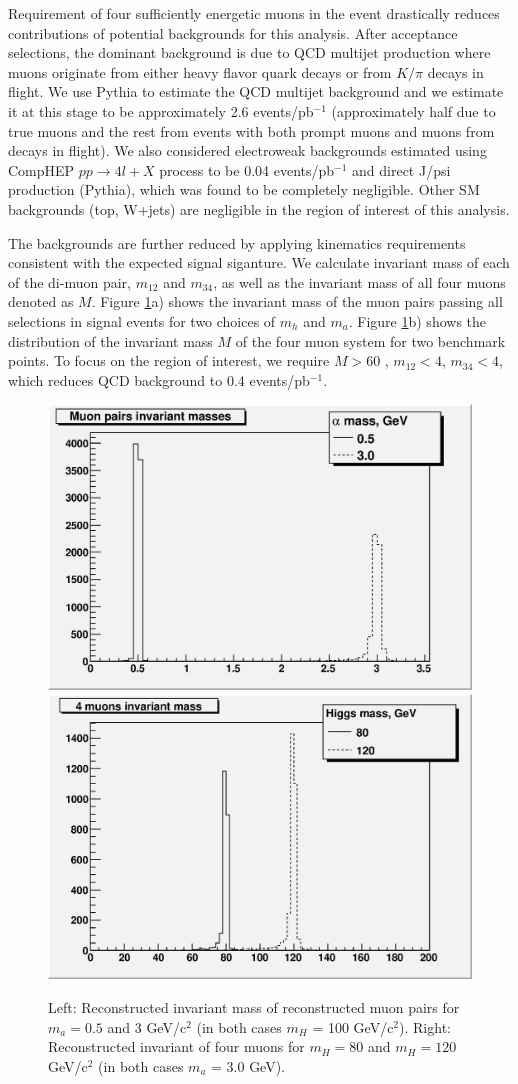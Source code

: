 \documentclass[aps,prl,twocolumn,nofootinbib,superscriptaddress]{revtex4}
\begin{document}
{Requirement of four sufficiently energetic muons in the event drastically reduces contributions of 
potential backgrounds for this analysis. After acceptance selections, the dominant background is 
due to QCD multijet production where muons originate from either heavy flavor quark decays or from 
$K/\pi$ decays in flight. We use Pythia to estimate the QCD multijet background and we estimate it
at this stage to be approximately 2.6 events/pb$^{-1}$ (approximately half due to true muons and the 
rest from events with both prompt muons and muons from decays in flight). We also considered electroweak 
backgrounds estimated using CompHEP $pp \to 4l+X$ process to be 0.04 events/pb$^{-1}$ and direct J/psi 
production (Pythia), which was found to be completely negligible. Other SM backgrounds (top, W+jets) 
are negligible in the region of interest of this analysis.

The backgrounds are further reduced by applying kinematics requirements consistent
with the expected signal siganture. We calculate invariant mass of each of the di-muon pair, 
$m_{12}$ and $m_{34}$, as well as the invariant mass of all four muons denoted as $M$. Figure 
\ref{muon_pairs_masses_invariant_mass}a) shows the invariant mass of the muon pairs passing 
all selections in signal events for two choices of $m_h$ and $m_a$. Figure \ref{muon_pairs_masses_invariant_mass}b) 
shows the distribution of the invariant mass $M$ of the four muon system for two benchmark points. 
To focus on the region of interest, we require $M>60$ \gevcc, $m_{12} < 4$, $m_{34} < 4$, which
reduces QCD background to 0.4 events/pb$^{-1}$. 

\begin{figure}[htb]
\begin{center}
\includegraphics[width=0.48\linewidth]{plots/muon_pairs_masses.eps}
\includegraphics[width=0.48\linewidth]{plots/invariant_mass.eps}
\caption{Left: Reconstructed invariant mass of reconstructed muon pairs for $m_a=0.5$ and 
3 GeV/c$^2$ (in both cases $m_H$ = 100 GeV/c$^2$). Right: Reconstructed invariant of four muons for 
$m_H=80$ and $m_H=120$ GeV/c$^2$ (in both cases $m_a$ = 3.0 GeV).}
\label{muon_pairs_masses_invariant_mass}
\end{center}
\end{figure}

}
\end{document}
